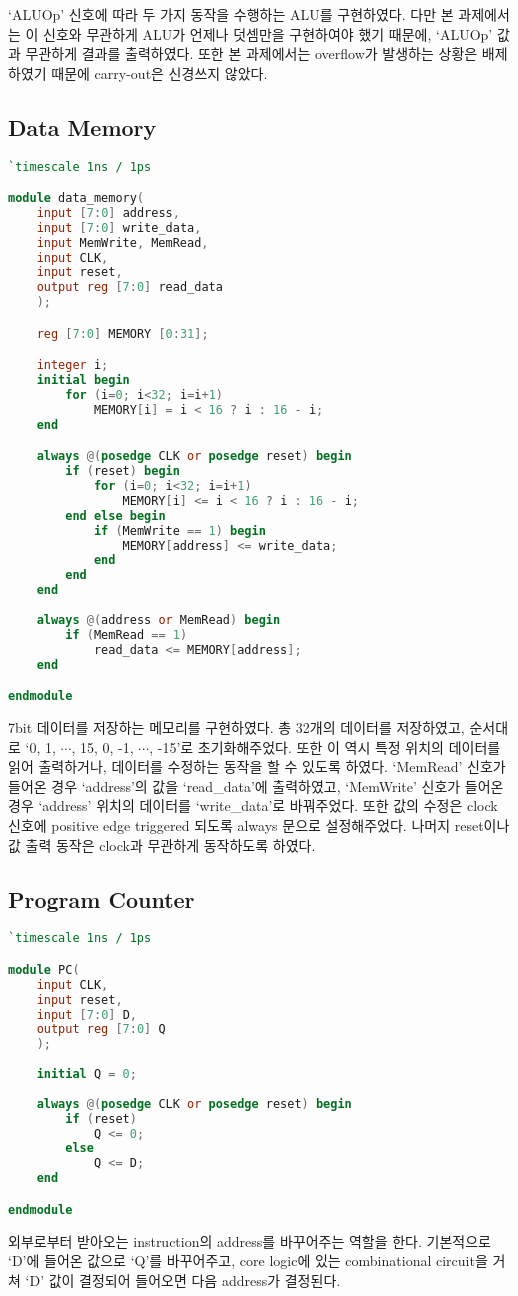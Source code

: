 \documentclass[10pt]{article}
\begin{document}
    `ALUOp' 신호에 따라 두 가지 동작을 수행하는 ALU를 구현하였다. 다만 본 과제에서는 이 신호와 무관하게 ALU가 언제나 덧셈만을 구현하여야 했기 때문에, `ALUOp' 값과 무관하게 결과를 출력하였다.
    또한 본 과제에서는 overflow가 발생하는 상황은 배제하였기 때문에 carry-out은 신경쓰지 않았다.
    
    \subsection{Data Memory}
    \begin{lstlisting}[language=Verilog, caption=data\_memory.v]
`timescale 1ns / 1ps

module data_memory(
	input [7:0] address,
	input [7:0] write_data,
	input MemWrite, MemRead,
	input CLK,
	input reset,
	output reg [7:0] read_data
	);

	reg [7:0] MEMORY [0:31];

	integer i;
	initial begin
		for (i=0; i<32; i=i+1)
			MEMORY[i] = i < 16 ? i : 16 - i;
	end

	always @(posedge CLK or posedge reset) begin
        if (reset) begin
            for (i=0; i<32; i=i+1)
                MEMORY[i] <= i < 16 ? i : 16 - i;
        end else begin
            if (MemWrite == 1) begin
                MEMORY[address] <= write_data;
            end
        end
    end
		
	always @(address or MemRead) begin
        if (MemRead == 1)
            read_data <= MEMORY[address];
    end

endmodule
    \end{lstlisting}

    7bit 데이터를 저장하는 메모리를 구현하였다. 
    총 32개의 데이터를 저장하였고, 순서대로 `0, 1, $\cdots$, 15, 0, -1, $\cdots$, -15'로 초기화해주었다.
    또한 이 역시 특정 위치의 데이터를 읽어 출력하거나, 데이터를 수정하는 동작을 할 수 있도록 하였다.
    `MemRead' 신호가 들어온 경우 `address'의 값을 `read\_data'에 출력하였고, `MemWrite' 신호가 들어온 경우 `address' 위치의 데이터를 `write\_data'로 바꿔주었다.
    또한 값의 수정은 clock 신호에 positive edge triggered 되도록 always 문으로 설정해주었다.
    나머지 reset이나 값 출력 동작은 clock과 무관하게 동작하도록 하였다.
    
    \subsection{Program Counter}
    \begin{lstlisting}[language=Verilog, caption=PC.v]
`timescale 1ns / 1ps

module PC(
    input CLK,
	input reset,
	input [7:0] D,
	output reg [7:0] Q
	);
	
	initial Q = 0;
	
	always @(posedge CLK or posedge reset) begin
        if (reset)
            Q <= 0;
        else
            Q <= D;
    end

endmodule
    \end{lstlisting}
    외부로부터 받아오는 instruction의 address를 바꾸어주는 역할을 한다.
    기본적으로 `D'에 들어온 값으로 `Q'를 바꾸어주고, core logic에 있는 combinational circuit을 거쳐 `D' 값이 결정되어 들어오면 다음 address가 결정된다.
\end{document}
